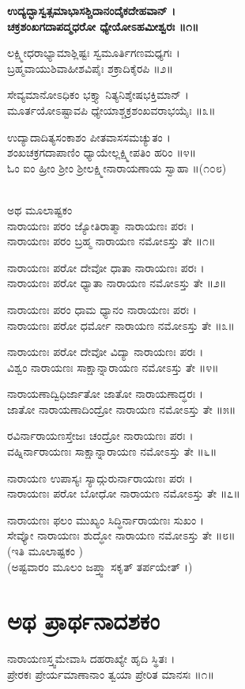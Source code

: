 	{\bfseries ಉದ್ಯದ್ಭಾಸ್ವತ್ಸಮಾಭಾಸಶ್ಚಿದಾನಂದೈಕದೇಹವಾನ್ ।\\
	ಚಕ್ರಶಂಖಗದಾಪದ್ಮಧರೋ ಧ್ಯೇಯೋಽಹಮೀಶ್ವರಃ ॥೧॥

ಲಕ್ಷ್ಮೀಧರಾಭ್ಯಾಮಾಶ್ಲಿಷ್ಟಃ ಸ್ವಮೂರ್ತಿಗಣಮಧ್ಯಗಃ ।\\
ಬ್ರಹ್ಮವಾಯುಶಿವಾಹೀಶವಿಪೈಃ ಶಕ್ರಾದಿಕೈರಪಿ ॥೨॥

	ಸೇವ್ಯಮಾನೋಽಧಿಕಂ ಭಕ್ತ್ಯಾ ನಿತ್ಯನಿಶ್ಶೇಷಭಕ್ತಿಮಾನ್ ।\\
	ಮೂರ್ತಯೋಽಷ್ಟಾವಪಿ ಧ್ಯೇಯಾಶ್ಚಕ್ರಶಂಖವರಾಭಯೈಃ ॥೩॥

ಉದ್ಯಾದಾದಿತ್ಯಸಂಕಾಶಂ ಪೀತವಾಸಸಮಚ್ಯುತಂ ।\\
ಶಂಖಚಕ್ರಗದಾಪಾಣಿಂ ಧ್ಯಾಯೇಲ್ಲಕ್ಷ್ಮೀಪತಿಂ ಹರಿಂ ॥೪॥\\
 ಓಂ ಐಂ ಹ್ರೀಂ ಶ್ರೀಂ ಶ್ರೀಲಕ್ಷ್ಮೀನಾರಾಯಣಾಯ ಸ್ವಾಹಾ ॥(೧೦೮)}\\
ಅಥ ಮೂಲಾಷ್ಟಕಂ\\
	ನಾರಾಯಣಃ ಪರಂ ಜ್ಯೋತಿರಾತ್ಮಾ ನಾರಾಯಣಃ ಪರಃ ।\\
	ನಾರಾಯಣಃ ಪರಂ ಬ್ರಹ್ಮ ನಾರಾಯಣ ನಮೋಽಸ್ತು ತೇ ॥೧॥

ನಾರಾಯಣಃ ಪರೋ ದೇವೋ ಧಾತಾ ನಾರಾಯಣಃ ಪರಃ ।\\
ನಾರಾಯಣಃ ಪರೋ ಧ್ಯಾತಾ ನಾರಾಯಣ ನಮೋಽಸ್ತು ತೇ ॥೨॥

	ನಾರಾಯಣಃ ಪರಂ ಧಾಮ ಧ್ಯಾನಂ ನಾರಾಯಣಃ ಪರಃ ।\\
	ನಾರಾಯಣಃ ಪರೋ ಧರ್ಮೋ ನಾರಾಯಣ ನಮೋಽಸ್ತು ತೇ ॥೩॥

ನಾರಾಯಣಃ ಪರೋ ದೇವೋ ವಿದ್ಯಾ ನಾರಾಯಣಃ ಪರಃ ।\\
ವಿಶ್ವಂ ನಾರಾಯಣಃ ಸಾಕ್ಷಾನ್ನಾರಾಯಣ ನಮೋಽಸ್ತು ತೇ ॥೪॥

	ನಾರಾಯಣಾದ್ವಿಧಿರ್ಜಾತೋ ಜಾತೋ ನಾರಾಯಣಾದ್ಧರಃ ।\\
	ಜಾತೋ ನಾರಾಯಣಾದಿಂದ್ರೋ ನಾರಾಯಣ ನಮೋಽಸ್ತು ತೇ ॥೫॥

ರವಿರ್ನಾರಾಯಣಸ್ತೇಜಃ ಚಂದ್ರೋ ನಾರಾಯಣಃ ಪರಃ ।\\
ವಹ್ನಿರ್ನಾರಾಯಣಃ ಸಾಕ್ಷಾನ್ನಾರಾಯಣ ನಮೋಽಸ್ತು ತೇ ॥೬॥

	ನಾರಾಯಣ ಉಪಾಸ್ಯಃ ಸ್ಯಾದ್ಗುರುರ್ನಾರಾಯಣಃ ಪರಃ ।\\
	ನಾರಾಯಣಃ ಪರೋ ಬೋಧೋ ನಾರಾಯಣ ನಮೋಽಸ್ತು ತೇ ॥೭॥

ನಾರಾಯಣಃ ಫಲಂ ಮುಖ್ಯಂ ಸಿದ್ಧಿರ್ನಾರಾಯಣಃ ಸುಖಂ ।\\
ಸೇವ್ಯೋ ನಾರಾಯಣಃ ಶುದ್ಧೋ ನಾರಾಯಣ ನಮೋಽಸ್ತು ತೇ ॥೮॥\\(ಇತಿ ಮೂಲಾಷ್ಟಕಂ )\\
(ಅಷ್ಟವಾರಂ ಮೂಲಂ ಜಪ್ತ್ವಾ ಸಕೃತ್ ತರ್ಪಯೇತ್ ।)
\section{ಅಥ ಪ್ರಾರ್ಥನಾದಶಕಂ}
	ನಾರಾಯಣಸ್ತ್ವಮೇವಾಸಿ ದಹರಾಖ್ಯೇ ಹೃದಿ ಸ್ಥಿತಃ ।\\
	ಪ್ರೇರಕಃ ಪ್ರೇರ್ಯಮಾಣಾನಾಂ ತ್ವಯಾ ಪ್ರೇರಿತ ಮಾನಸಃ ॥೧॥

